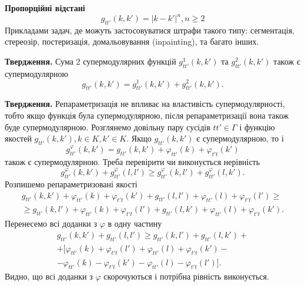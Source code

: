 \textbf{Пропорційні відстані}
\begin{equation}
  g_{tt'}(k,k') = |k - k'|^n, n\geq 2
 \end{equation}
Прикладами задач, де можуть застосовуватися штрафи такого типу: сегментація, 
стереозір, постеризація, домальовування (inpainting), та багато інших.

\textbf{Твердження.}
Сума 2 супермодулярних функцій $g^1_{tt'}(k,k')$ та $g^2_{tt'}(k,k')$ також є супермодулярною
\begin{equation}
  g_{tt'}(k,k')=g^1_{tt'}(k,k')+g^2_{tt'}(k,k').
 \end{equation} 

\textbf{Твердження.}
Репараметризація не впливає на властивість супермодулярності, тобто якщо функція була
супермодулярною, після репараметризації вона також буде супермодулярною.
Розглянемо довільну пару сусідів $tt'\in\Gamma$ і функцію якостей $g_{tt'}(k,k'), k\in K, k'\in K$.
Якщо $g_{tt'}(k,k')$ є супермодулярною, то і
\begin{equation}
  g^{\varphi}_{tt'}(k,k')=g_{tt'}(k,k') + \varphi_{tt'}(k) + \varphi_{t't}(k')
\end{equation} також є супермодулярною.
Треба перевірити чи виконується нерівність
\begin{equation}
  g^{\varphi}_{tt'}(k,k') + g^{\varphi}_{tt'}(l,l')\geq g^{\varphi}_{tt'}(k,l') + g^{\varphi}_{tt'}(l,k').
\end{equation}
Розпишемо репараметризовані якості
\begin{equation}
  \begin{aligned}
  g_{tt'}(k,k') + \varphi_{tt'}(k) + \varphi_{t't}(k') + g_{tt'}(l,l') + \varphi_{tt'}(l) + \varphi_{t't}(l') \geq \\
  \geq g_{tt'}(k,l') + \varphi_{tt'}(k) + \varphi_{t't}(l') + g_{tt'}(l,k') + \varphi_{tt'}(l) + \varphi_{t't}(k').
\end{aligned}
\end{equation}
Перенесемо всі доданки з $\varphi$ в одну частину
\begin{equation}
  \begin{aligned}
  g_{tt'}(k,k') + g_{tt'}(l,l') \geq g_{tt'}(k,l') + g_{tt'}(l,k') + \\
  + [\varphi_{tt'}(k) + \varphi_{t't}(l')  + \varphi_{tt'}(l) + \varphi_{t't}(k')-\\
   -\varphi_{tt'}(k) - \varphi_{t't}(k') - \varphi_{tt'}(l) - \varphi_{t't}(l')].
\end{aligned}
\end{equation}
Видно, що всі доданки з $\varphi$ скорочуються і потрібна рівність виконується.
